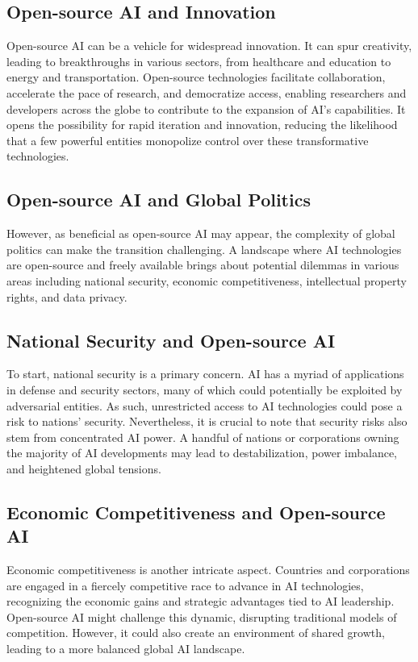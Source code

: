 \subsection{Open-source AI and Innovation}
Open-source AI can be a vehicle for widespread innovation. It can spur creativity, leading to breakthroughs in various sectors, from healthcare and education to energy and transportation. Open-source technologies facilitate collaboration, accelerate the pace of research, and democratize access, enabling researchers and developers across the globe to contribute to the expansion of AI's capabilities. It opens the possibility for rapid iteration and innovation, reducing the likelihood that a few powerful entities monopolize control over these transformative technologies.

\subsection{Open-source AI and Global Politics}
However, as beneficial as open-source AI may appear, the complexity of global politics can make the transition challenging. A landscape where AI technologies are open-source and freely available brings about potential dilemmas in various areas including national security, economic competitiveness, intellectual property rights, and data privacy.

\subsection{National Security and Open-source AI}
To start, national security is a primary concern. AI has a myriad of applications in defense and security sectors, many of which could potentially be exploited by adversarial entities. As such, unrestricted access to AI technologies could pose a risk to nations' security. Nevertheless, it is crucial to note that security risks also stem from concentrated AI power. A handful of nations or corporations owning the majority of AI developments may lead to destabilization, power imbalance, and heightened global tensions.

\subsection{Economic Competitiveness and Open-source AI}
Economic competitiveness is another intricate aspect. Countries and corporations are engaged in a fiercely competitive race to advance in AI technologies, recognizing the economic gains and strategic advantages tied to AI leadership. Open-source AI might challenge this dynamic, disrupting traditional models of competition. However, it could also create an environment of shared growth, leading to a more balanced global AI landscape.

